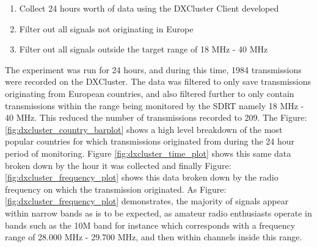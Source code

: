 \documentclass[runningheads,a4paper]{llncs}
\begin{document}
\begin{enumerate}
	\item Collect 24 hours worth of data using the \gls{DXCluster} Client developed
	\item Filter out all signals not originating in Europe
	\item Filter out all signals outside the target range of 18 MHz - 40 MHz
\end{enumerate}

The experiment was run for 24 hours, and during this time, 1984 transmissions were recorded on the \gls{DXCluster}. The data was filtered to only save transmissions originating from European countries, and also filtered further to only contain transmissions within the range being monitored by the SDRT namely 18 MHz - 40 MHz. This reduced the number of transmissions recorded to 209. The Figure: \ref{fig:dxcluster_country_barplot} shows a high level breakdown of the most popular countries for which transmissions originated from during the 24 hour period of monitoring. Figure \ref{fig:dxcluster_time_plot} shows this same data broken down by the hour it was collected and finally Figure: \ref{fig:dxcluster_frequency_plot} shows this data broken down by the radio frequency on which the transmission originated. As Figure: \ref{fig:dxcluster_frequency_plot} demonstrates, the majority of signals appear within narrow bands as is to be expected, as amateur radio enthusiasts operate in bands such as the 10M band for instance which corresponds with a frequency range of 28.000 MHz - 29.700 MHz, and then within channels inside this range.
\end{document}
